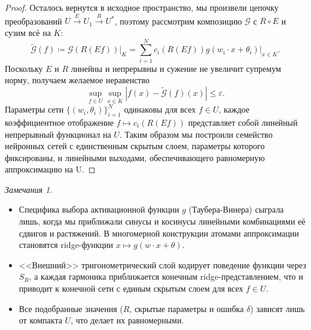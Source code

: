 \documentclass[a4paper, 12pt]{article}
\theoremstyle{definition}
\theoremstyle{plain}
\theoremstyle{remark}
\theoremstyle{remark}
\newtheorem*{remarks}{Замечания}
\theoremstyle{remark}
\begin{document}
\begin{proof}
  Осталось вернутся в исходное пространство, мы произвели цепочку преобразований $U \xrightarrow{E} U_1 \xrightarrow{R} U^*$, поэтому рассмотрим композицию $\mathcal{G}$ с $R \circ E$ и сузим всё на $K$:
  $$\widetilde{\mathcal{G}}(f) \coloneq \mathcal{G}\left(R(Ef)\right) \big|_K = \sum_{i=1}^{N} c_i\left(R(Ef)\right) g(w_i \cdot x + \theta_i)\Big|_{x \in K}.$$
  Поскольку $E$ и $R$ линейны и непрерывны и сужение не увеличит супремум норму, получаем желаемое неравенство
  $$\sup_{f \in U} \sup_{x \in K} |f(x) - \widetilde{\mathcal{G}}(f)(x)| \le \varepsilon.$$
  Параметры сети $\{(w_i, \theta_i)\}_{i=1}^{N}$ одинаковы для всех $f \in U$, каждое коэффициентное отображение $f \mapsto c_i\left(R(Ef)\right)$ представляет собой линейный непрерывный функционал на $U$.
  Таким образом мы построили семейство нейронных сетей с единственным скрытым слоем, параметры которого фиксированы, и линейными выходами, обеспечивающего равномерную аппроксимацию на U.
\end{proof}
\newpage
\begin{remarks}
  \leavevmode
  \begin{itemize}
    \item Специфика выбора активационной функции $g$ (Таубера-Винера) сыграла лишь, когда мы приближали синусы и косинусы линейными комбинациями её сдвигов и растяжений.
    В многомерной конструкции атомами аппроксимации становятся ridge-функции $x \mapsto g(w \cdot x + \theta)$.
    \item <<Внешний>> тригонометрический слой кодирует поведение функции через $S_R$, а каждая гармоника приближается конечным ridge-представлением, что и приводит к конечной сети с единым скрытым слоем для всех $f \in U$.
    \item Все подобранные значения ($R$, скрытые параметры и ошибка $\delta$) зависят лишь от компакта $U$, что делает их равномерными.
  \end{itemize}
\end{remarks}
\end{document}
